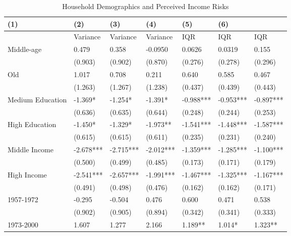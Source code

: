 \documentclass[]{article}
\begin{document}
\begin{table}
	\centering
	\caption{Household Demographics and Perceived Income Risks}
	\label{Moment_Group}
	\begin{tabular}{lllllll}
			\hline 
		(1)                                             & (2)       & (3)          & (4)       & (5)       & (6)       &            \\
			\hline 
		& Variance  & Variance     & Variance  & IQR       & IQR       & IQR        \\
			\hline 
		Middle-age                                      & 0.479     & 0.358        & -0.0950   & 0.0626    & 0.0319    & 0.155      \\
		& (0.903)   & (0.902)      & (0.870)   & (0.276)   & (0.278)   & (0.296)    \\
		Old                                             & 1.017     & 0.708        & 0.211     & 0.640     & 0.585     & 0.467      \\
		& (1.263)   & (1.267)      & (1.238)   & (0.437)   & (0.439)   & (0.443)    \\
		Medium Education                                & -1.369*   & -1.254*      & -1.391*   & -0.988*** & -0.953*** & -0.897***  \\
		& (0.636)   & (0.635)      & (0.644)   & (0.248)   & (0.244)   & (0.253)    \\
		High Education                                  & -1.450*   & -1.329*      & -1.973**  & -1.541*** & -1.448*** & -1.587***  \\
		& (0.615)   & (0.615)      & (0.611)   & (0.235)   & (0.231)   & (0.240)    \\
		Middle Income                                   & -2.678*** & -2.715***    & -2.012*** & -1.359*** & -1.285*** & -1.100***  \\
		& (0.500)   & (0.499)      & (0.485)   & (0.173)   & (0.171)   & (0.179)    \\
		High Income                                     & -2.541*** & -2.657***    & -1.991*** & -1.467*** & -1.325*** & -1.167***  \\
		& (0.491)   & (0.498)      & (0.476)   & (0.162)   & (0.162)   & (0.171)    \\
		1957-1972                                       & -0.295    & -0.504       & 0.476     & 0.600     & 0.471     & 0.538      \\
		& (0.902)   & (0.905)      & (0.894)   & (0.342)   & (0.341)   & (0.333)    \\
		1973-2000                                       & 1.607     & 1.277        & 2.166     & 1.189**   & 1.014*    & 1.323**    \\

\end{tabular}
\end{table}
\end{document}
